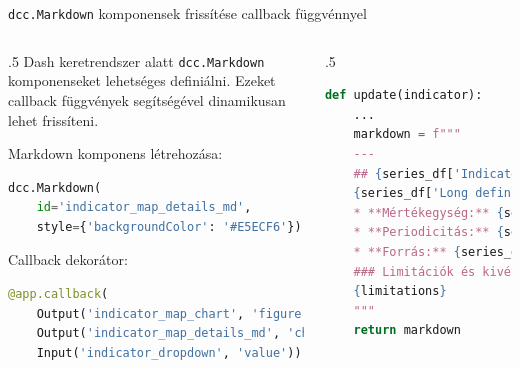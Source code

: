 \documentclass[english, aspectratio=169]{beamer}
\begin{document}
	
	\begin{frame}[fragile]{\texttt{dcc.Markdown} komponensek frissítése callback függvénnyel}
		\begin{columns}
			\begin{column}{.5\textwidth}
				Dash keretrendszer alatt \texttt{dcc.Markdown} komponenseket lehetséges definiálni. Ezeket callback függvények segítségével dinamikusan lehet frissíteni.\par\smallskip
				Markdown komponens létrehozása:
				\begin{lstlisting}[language=python]
dcc.Markdown(
	id='indicator_map_details_md',
	style={'backgroundColor': '#E5ECF6'})				
				\end{lstlisting}
				Callback dekorátor:
				\begin{lstlisting}[language=python]
@app.callback(
	Output('indicator_map_chart', 'figure'),
	Output('indicator_map_details_md', 'children'),
	Input('indicator_dropdown', 'value'))
				\end{lstlisting}
			\end{column}
			\begin{column}{.5\textwidth}
				\begin{lstlisting}[language=python]
def update(indicator):
	...
	markdown = f"""
	---
	## {series_df['Indicator Name'].values[0]}
	{series_df['Long definition'].values[0]}
	* **Mértékegység:** {series_df['Unit of measure'].fillna('count').values[0]}
	* **Periodicitás:** {series_df['Periodicity'].fillna('N/A').values[0]}
	* **Forrás:** {series_df['Source'].values[0]}
	### Limitációk és kivételek: 
	{limitations}
	"""
	return markdown				
				\end{lstlisting}
			\end{column}
		\end{columns}
	\end{frame}
	
\end{document}
